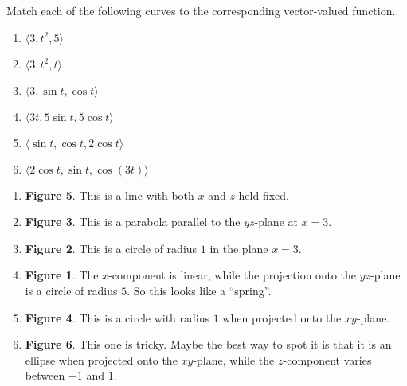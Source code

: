 \documentclass[]{ximera}
\begin{document}
\begin{instructorNotes}

\end{instructorNotes}








\begin{problem}
Match each of the following curves to the corresponding vector-valued function.
	\begin{multicols}{3}
	\begin{enumerate}
	\item  $\langle 3, t^2,5 \rangle$
	\item  $\langle 3, t^2,t \rangle$
	\item  $\langle 3, \sin t , \cos t \rangle$
	\item  $\langle 3t,5 \sin t, 5\cos t \rangle$
	\item  $\langle \sin t, \cos t, 2 \cos t \rangle$
	\item  $\langle 2 \cos t, \sin t, \cos (3t) \rangle$
	\end{enumerate}
	\end{multicols}
	
	
	\begin{freeResponse}
	\begin{enumerate}
	\item  {\bf Figure 5}.  This is a line with both $x$ and $z$ held fixed.
	
	\item  {\bf Figure 3}.  This is a parabola parallel to the $yz$-plane at $x=3$. 
	
	\item  {\bf Figure 2}.  This is a circle of radius $1$ in the plane $x=3$.  
	
	\item  {\bf Figure 1}.  The $x$-component is linear, while the projection onto the $yz$-plane is a circle of radius $5$.  
	So this looks like a ``spring''.
	
	\item  {\bf Figure 4}.  This is a circle with radius $1$ when projected onto the $xy$-plane.
	
	\item  {\bf Figure 6}.  This one is tricky.  Maybe the best way to spot it is that it is an ellipse when projected onto the $xy$-plane, while the $z$-component varies between $-1$ and $1$.
	
	\end{enumerate}
	\end{freeResponse}

\end{problem}
\end{document}
